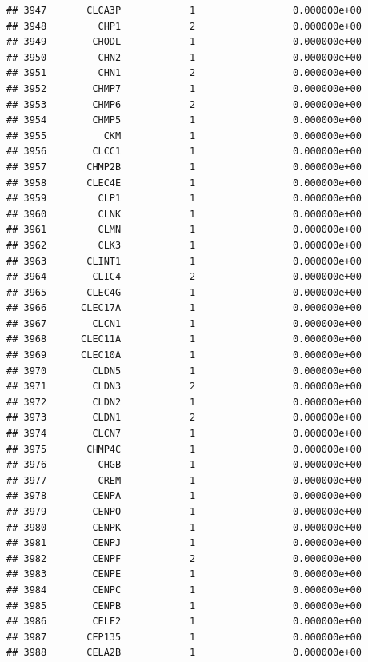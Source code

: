 \documentclass[
]{article}
\begin{document}
\begin{verbatim}
## 3947       CLCA3P            1                 0.000000e+00
## 3948         CHP1            2                 0.000000e+00
## 3949        CHODL            1                 0.000000e+00
## 3950         CHN2            1                 0.000000e+00
## 3951         CHN1            2                 0.000000e+00
## 3952        CHMP7            1                 0.000000e+00
## 3953        CHMP6            2                 0.000000e+00
## 3954        CHMP5            1                 0.000000e+00
## 3955          CKM            1                 0.000000e+00
## 3956        CLCC1            1                 0.000000e+00
## 3957       CHMP2B            1                 0.000000e+00
## 3958       CLEC4E            1                 0.000000e+00
## 3959         CLP1            1                 0.000000e+00
## 3960         CLNK            1                 0.000000e+00
## 3961         CLMN            1                 0.000000e+00
## 3962         CLK3            1                 0.000000e+00
## 3963       CLINT1            1                 0.000000e+00
## 3964        CLIC4            2                 0.000000e+00
## 3965       CLEC4G            1                 0.000000e+00
## 3966      CLEC17A            1                 0.000000e+00
## 3967        CLCN1            1                 0.000000e+00
## 3968      CLEC11A            1                 0.000000e+00
## 3969      CLEC10A            1                 0.000000e+00
## 3970        CLDN5            1                 0.000000e+00
## 3971        CLDN3            2                 0.000000e+00
## 3972        CLDN2            1                 0.000000e+00
## 3973        CLDN1            2                 0.000000e+00
## 3974        CLCN7            1                 0.000000e+00
## 3975       CHMP4C            1                 0.000000e+00
## 3976         CHGB            1                 0.000000e+00
## 3977         CREM            1                 0.000000e+00
## 3978        CENPA            1                 0.000000e+00
## 3979        CENPO            1                 0.000000e+00
## 3980        CENPK            1                 0.000000e+00
## 3981        CENPJ            1                 0.000000e+00
## 3982        CENPF            2                 0.000000e+00
## 3983        CENPE            1                 0.000000e+00
## 3984        CENPC            1                 0.000000e+00
## 3985        CENPB            1                 0.000000e+00
## 3986        CELF2            1                 0.000000e+00
## 3987       CEP135            1                 0.000000e+00
## 3988       CELA2B            1                 0.000000e+00

\end{verbatim}
\end{document}
